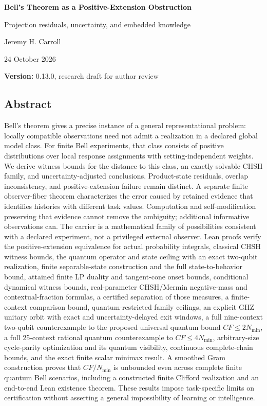 \documentclass[
]{article}
\author{}
\date{}
\begin{document}
\begin{center}
{\LARGE\bfseries Bell's Theorem as a Positive-Extension Obstruction\par}
\vspace{0.6em}
{\large Projection residuals, uncertainty, and embedded knowledge\par}
\vspace{1em}
Jeremy H. Carroll\par
24 October 2026\par
\textbf{Version:} 0.13.0, research draft for author review\par
\end{center}

\subsection{Abstract}\label{abstract}

Bell's theorem gives a precise instance of a general representational problem: locally compatible observations need not admit a realization in a declared global model class. For finite Bell experiments, that class consists of positive distributions over local response assignments with setting-independent weights. We derive witness bounds for the distance to this class, an exactly solvable CHSH family, and uncertainty-adjusted conclusions. Product-state residuals, overlap inconsistency, and positive-extension failure remain distinct. A separate finite observer-fiber theorem characterizes the error caused by retained evidence that identifies histories with different task values. Computation and self-modification preserving that evidence cannot remove the ambiguity; additional informative observations can. The carrier is a mathematical family of possibilities consistent with a declared experiment, not a privileged external observer. Lean proofs verify the positive-extension equivalence for actual probability integrals, classical CHSH witness bounds, the quantum operator and state ceiling with an exact two-qubit realization, finite separable-state construction and the full state-to-behavior bound, attained finite LP duality and tangent-cone onset bounds, conditional dynamical witness bounds, real-parameter CHSH/Mermin negative-mass and contextual-fraction formulas, a certified separation of those measures, a finite-context comparison bound, quantum-restricted family ceilings, an explicit GHZ unitary orbit with exact and uncertainty-delayed exit windows, a full nine-context two-qubit counterexample to the proposed universal quantum bound \(CF\le2N_{\min}\), a full 25-context rational quantum counterexample to \(CF\le4N_{\min}\), arbitrary-size cycle-parity optimization and its quantum visibility, continuous complete-chain bounds, and the exact finite scalar minimax result. A smoothed Gram construction proves that \(CF/N_{\min}\) is unbounded even across complete finite quantum Bell scenarios, including a constructed finite Clifford realization and an end-to-end Lean existence theorem. These results impose task-specific limits on certification without asserting a general impossibility of learning or intelligence.
\end{document}
